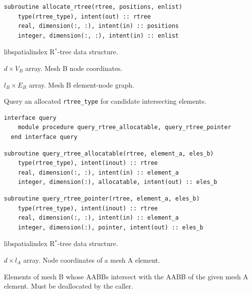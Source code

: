 \documentclass{article}
\begin{document}
\begin{lstlisting}[language=FORTRAN]  
  subroutine allocate_rtree(rtree, positions, enlist)
    type(rtree_type), intent(out) :: rtree
    real, dimension(:, :), intent(in) :: positions
    integer, dimension(:, :), intent(in) :: enlist
\end{lstlisting}

\begin{description}[font=\ttfamily\bfseries,leftmargin=2.2\parindent,labelindent=1.7\parindent,noitemsep]
  \item[rtree] libspatialindex R${}^*$-tree data structure.
  \item[positions] $d \times V_B$ array. Mesh B node coordinates.
  \item[enlist] $l_B \times E_B$ array. Mesh B element-node graph.
\end{description}

\noindent Query an allocated \verb+rtree_type+ for candidate intersecting
elements.
  
\begin{lstlisting}[language=FORTRAN]
  interface query
    module procedure query_rtree_allocatable, query_rtree_pointer
  end interface query
\end{lstlisting}
    
\begin{lstlisting}[language=FORTRAN]    
  subroutine query_rtree_allocatable(rtree, element_a, eles_b)
    type(rtree_type), intent(inout) :: rtree
    real, dimension(:, :), intent(in) :: element_a
    integer, dimension(:), allocatable, intent(out) :: eles_b
\end{lstlisting}
  
\begin{lstlisting}[language=FORTRAN]      
  subroutine query_rtree_pointer(rtree, element_a, eles_b)
    type(rtree_type), intent(inout) :: rtree
    real, dimension(:, :), intent(in) :: element_a
    integer, dimension(:), pointer, intent(out) :: eles_b
\end{lstlisting}

\begin{description}[font=\ttfamily\bfseries,leftmargin=2.2\parindent,labelindent=1.7\parindent,noitemsep]
  \item[rtree] libspatialindex R${}^*$-tree data structure.
  \item[element\_a] $d \times l_A$ array. Node coordinates of a mesh A element.
  \item[eles\_b] Elements of mesh B whose AABBs intersect with the AABB of the
    given mesh A element. Must be deallocated by the caller.
\end{description}
\end{document}
